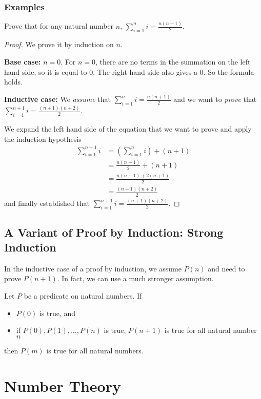 \documentclass[11pt]{article}
\begin{document}
\subsubsection{Examples}

Prove that for any natural number $n$, $\sum_{i=1}^n i = \frac{n(n+1)}{2}$.

\begin{proof}
We prove it by induction on $n$.

\textbf{Base case:} $n = 0$. For $n = 0$, there are no terms in the summation on the left
hand side, so it is equal to $0$. The right hand side also gives a $0$. So the formula
holds.

\textbf{Inductive case:} We \emph{assume} that $\sum_{i=1}^n i = \frac{n(n+1)}{2}$ and we
want to \emph{prove} that $\sum_{i=1}^{n+1} i = \frac{(n+1)(n+2)}{2}$.

We expand the left hand side of the equation that we want to prove and apply the induction
hypothesis
\begin{align*}
\sum_{i=1}^{n+1} i &= (\sum_{i=1}^n i) + (n+1) \\
&= \frac{n(n+1)}{2} + (n+1) \\
&= \frac{n(n+1)+2(n+1)}{2} \\
&= \frac{(n+1)(n+2)}{2}
\end{align*}
and finally established that $\sum_{i=1}^{n+1} i = \frac{(n+1)(n+2)}{2}$.

\end{proof}

\subsection{A Variant of Proof by Induction: Strong Induction}

In the inductive case of a proof by induction, we assume $P(n)$ and need to prove $P(n+1)$.
In fact, we can use a much stronger assumption.

\begin{theorem}
Let $P$ be a predicate on natural numbers. If
\begin{itemize}
\item $P(0)$ is true, and
\item if $P(0), P(1), \dots, P(n)$ is true, $P(n+1)$ is true for all natural number $n$
\end{itemize}
then $P(m)$ is true for all natural numbers.
\end{theorem}

\section{Number Theory}
\end{document}
